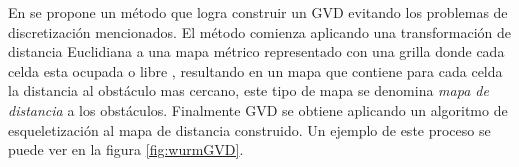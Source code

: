 En \cite{wurm2008coordinated} se propone un método que logra construir un GVD evitando los problemas de discretización mencionados. El método comienza aplicando una transformación de distancia Euclidiana \cite{meijster2002general} a una mapa métrico representado con una grilla donde cada celda esta ocupada o libre , resultando en un mapa que contiene para cada celda la distancia al obstáculo mas cercano, este tipo de mapa se denomina \emph{mapa de distancia} a los obstáculos. Finalmente GVD se obtiene aplicando un algoritmo de esqueletización \cite{wan2008distance} al mapa de distancia construido. Un ejemplo de este proceso se puede ver en la figura \ref{fig:wurmGVD}.
